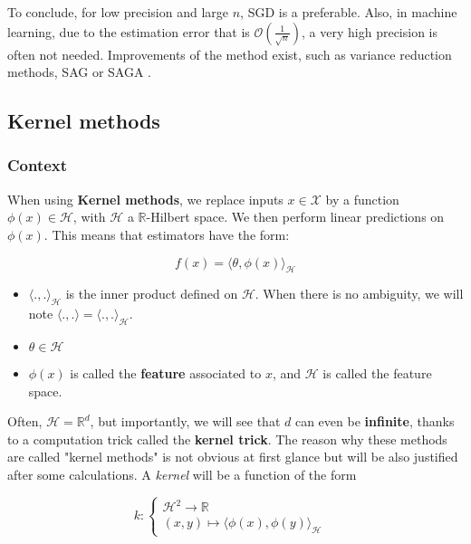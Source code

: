 \documentclass[
10pt, %
a4paper, %
oneside, %
headinclude,footinclude, %
BCOR5mm, %
]{scrartcl}
\begin{document}
To conclude, for low precision and large $n$, SGD is a preferable. Also, in
machine learning, due to the estimation error that is $ \mathcal{O} (
\frac{1}{\sqrt{n} }) $, a very high precision is often not needed. Improvements
of the method exist, such as variance reduction methods, SAG or SAGA \cite[]{Schmidt2013}. 

\subsection{\large\color{MidnightBlue}Kernel methods}

\subsubsection{\large\color{Periwinkle}Context}

When using \textbf{{Kernel methods}}, we replace inputs $x\in  \mathcal{X} $ by a function $\phi(x)\in \mathcal{H}$, with $ \mathcal{H} $ a $ \mathbb{R} $-Hilbert space. We then perform linear predictions on $\phi(x)$. This means that estimators have the form: 

\begin{equation}
    f(x) = \langle\theta, \phi(x) \rangle_{ \mathcal{H} }
\end{equation}

\begin{itemize}
    \item $ \langle ., . \rangle_{ \mathcal{H} }$ is the inner product defined on $ \mathcal{H} $. When there is no ambiguity, we will note $ \langle ., . \rangle= \langle ., . \rangle_{ \mathcal{H} }$.
    \item $ \theta\in  \mathcal{H} $
    \item $ \phi(x)$ is called the \textbf{{feature}} associated to $x$, and $ \mathcal{H} $ is called the feature space.
\end{itemize}

Often, $ \mathcal{H} = \mathbb{R}^d $, but importantly, we will see that $d$ can even be \textbf{{infinite}}, thanks to a computation trick called the \textbf{{kernel trick}}. The reason why these methods are called "kernel methods" is not obvious at first glance but will be also justified after some calculations.  A \textit{{kernel}} will be a function of the form


$$
k  : \left\{
    \begin{array}{ll}
	\mathcal{H}^2  \rightarrow \mathbb{R}  \\
	(x,y) \mapsto \langle \phi(x), \phi(y) \rangle_{ \mathcal{H} } & 
    \end{array}
\right.
$$
\\
\end{document}
